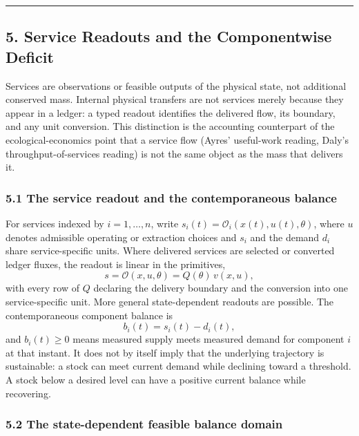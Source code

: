 \documentclass[11pt]{article}
\begin{document}
\begin{center}\rule{0.5\linewidth}{0.5pt}\end{center}

\subsection{5. Service Readouts and the Componentwise
Deficit}\label{service-readouts-and-the-componentwise-deficit}

Services are observations or feasible outputs of the physical state, not
additional conserved mass. Internal physical transfers are not services
merely because they appear in a ledger: a typed readout identifies the
delivered flow, its boundary, and any unit conversion. This distinction
is the accounting counterpart of the ecological-economics point that a
service flow (Ayres' useful-work reading, Daly's throughput-of-services
reading) is not the same object as the mass that delivers it.

\subsubsection{5.1 The service readout and the contemporaneous
balance}\label{the-service-readout-and-the-contemporaneous-balance}

For services indexed by \(i = 1, \ldots, n\), write \(s_i(t) = \mathcal{O}_i(x(t), u(t), \theta)\), where \(u\) denotes admissible operating or extraction choices and \(s_i\) and the demand \(d_i\) share service-specific units. Where delivered services are selected or converted ledger fluxes, the readout is linear in the primitives, \[s = \mathcal{O}(x, u, \theta) = Q(\theta)\, v(x, u),\] with every row of \(Q\) declaring the delivery boundary and the conversion into one service-specific unit. More general state-dependent readouts are possible. The contemporaneous component balance is \[b_i(t) = s_i(t) - d_i(t),\] and \(b_i(t) \ge 0\) means measured supply meets measured demand for component \(i\) at that instant. It does not by itself imply that the underlying trajectory is sustainable: a stock can meet current demand while declining toward a threshold. A stock below a desired level can have a positive current balance while recovering.

\subsubsection{5.2 The state-dependent feasible balance
domain}\label{the-state-dependent-feasible-balance-domain}
\end{document}

